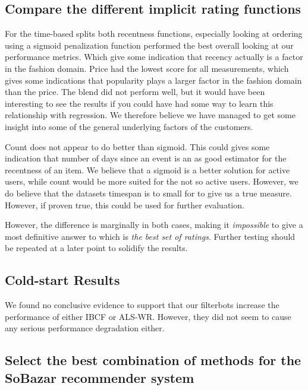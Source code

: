 \subsection{Compare the different implicit rating functions}

For the time-based splits both recentness functions, especially looking at ordering using a sigmoid penalization function
performed the best overall looking at our performance metrics. Which give some indication that recency actually is a factor
in the fashion domain. Price had the lowest score for all measurements, which gives some indications that popularity plays
a larger factor in the fashion domain than the price. The blend did not perform well, but it would have been interesting to
see the results if you could have had some way to learn this relationship with regression. We therefore believe we have
managed to get some insight into some of the general underlying factors of the customers.

Count does not appear to do better than sigmoid. This could gives some indication that number of days since an event is an as good estimator
for the recentness of an item. We believe that a sigmoid is a better solution for active users, while count would be more
suited for the not so active users. However, we do believe that the datasets timespan is to small for to give us a true measure.
However, if proven true, this could be used for further evaluation.


However, the difference is marginally in both cases, making it \emph{impossible} to give a most definitive
answer to which is \emph{the best set of ratings}. Further testing should be repeated at a later point to
solidify the results.

\subsection{Cold-start Results}

We found no conclusive evidence to support that our filterbots increase the performance of either IBCF or ALS-WR.
However, they did not seem to cause any serious performance degradation either.

\subsection{Select the best combination of methods for the SoBazar recommender system}

